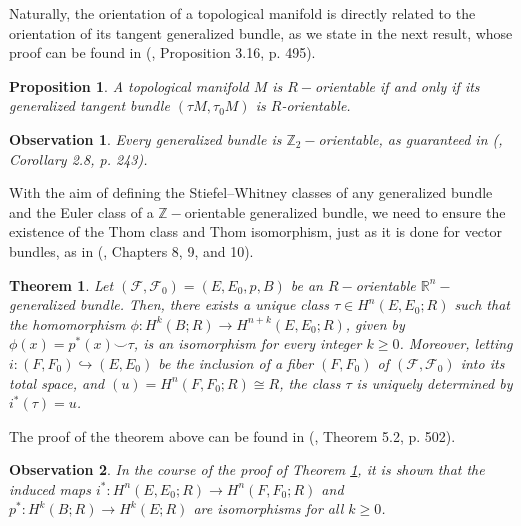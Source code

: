 \documentclass[12pt,oneside]{book}
\newtheorem{teo}    {Theorem}[chapter]
\newtheorem{prop}   {Proposition}[chapter]
\newtheorem{obs}    {Observation}[chapter]
\newcommand{\R}{\mathbb{R}}
\newcommand{\Z}{\mathbb{Z}}
\newcommand{\ccup}{\smile}
\begin{document}
    Naturally, the orientation of a topological manifold is directly related to the orientation of its tangent 
    generalized bundle, as we state in the next result, whose proof can be found in 
    (\cite{fadell_1}, Proposition 3.16, p. 495).

    \begin{prop}\label{propriedade_orient_var}
    	A topological manifold $M$ is $R-$orientable if and only if its generalized tangent bundle $(\tau M,\tau_{0}M)$ is $R$-orientable.
    \end{prop}

    \begin{obs}
    	Every generalized bundle is $\Z_{2}-$orientable, as guaranteed in (\cite{allaud}, Corollary 2.8, p. 243).
    \end{obs}

    With the aim of defining the Stiefel–Whitney classes of any generalized bundle and the 
    Euler class of a $\Z-$orientable generalized bundle, we need to ensure the existence of the Thom class and Thom 
    isomorphism, just as it is done for vector bundles, as in (\cite{milnor_1}, Chapters 8, 9, and 10).

    \begin{teo}\label{teo_iso_thom_fht}
    	Let $(\mathcal{F},\mathcal{F}_{0})=(E,E_{0},p,B)$ be an $R-$orientable $\R^{n}-$ generalized bundle. Then, there exists a unique class 
        $\tau\in H^{n}(E,E_{0};R)$ such that the homomorphism $\phi:H^{k}(B;R)\to H^{n+k}(E,E_{0};R)$, given by $\phi(x)=p^{*}(x)\ccup \tau$, 
        is an isomorphism for every integer $k\geq 0$. Moreover, letting $i:(F,F_{0})\hookrightarrow (E,E_{0})$ be the inclusion of a fiber 
        $(F,F_{0})$ of $(\mathcal{F},\mathcal{F}_{0})$ into its total space, and $(u)=H^{n}(F,F_{0};R)\cong R$, the class $\tau$ is uniquely 
        determined by $i^{*}(\tau)=u$.
    \end{teo}

    The proof of the theorem above can be found in (\cite{fadell_1}, Theorem 5.2, p. 502).

    \begin{obs}\label{obs_proj_iso}
    	In the course of the proof of Theorem \ref{teo_iso_thom_fht}, it is shown that the induced maps 
        $i^{*}:H^{n}(E,E_{0};R)\to H^{n}(F,F_{0};R)$ and $p^{*}:H^{k}(B;R)\to H^{k}(E;R)$ are isomorphisms for all $k\geq 0$.
    \end{obs}
\end{document}
